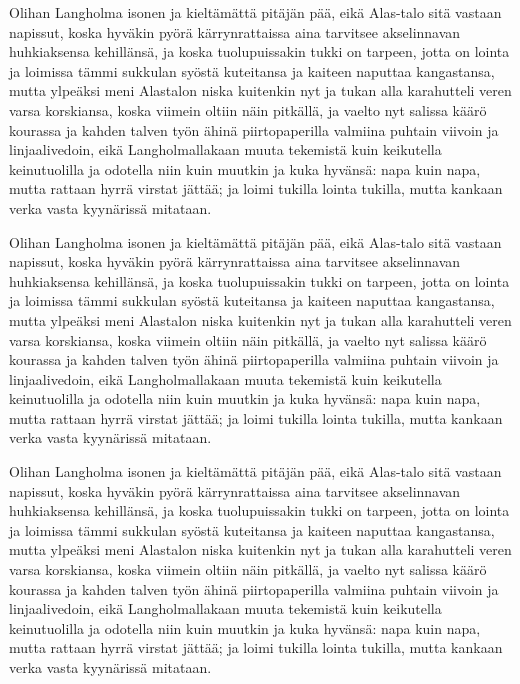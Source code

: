 \documentclass[twoside,a4paper]{article}
\begin{document}
Olihan Langholma isonen ja kielt\"{a}m\"{a}tt\"{a} pit\"{a}j\"{a}n p\"{a}\"{a}, eik\"{a} Alas-talo sit\"{a}
vastaan napissut, koska hyv\"{a}kin py\"{o}r\"{a} k\"{a}rrynrattaissa aina tarvitsee
akselinnavan huhkiaksensa kehill\"{a}ns\"{a}, ja koska tuolupuissakin tukki on
tarpeen, jotta on lointa ja loimissa t\"{a}mmi sukkulan sy\"{o}st\"{a} kuteitansa
ja kaiteen naputtaa kangastansa, mutta ylpe\"{a}ksi meni Alastalon niska
kuitenkin nyt ja tukan alla karahutteli veren varsa korskiansa, koska
viimein oltiin n\"{a}in pitk\"{a}ll\"{a}, ja vaelto nyt salissa k\"{a}\"{a}r\"{o} kourassa ja
kahden talven ty\"{o}n \"{a}hin\"{a} piirtopaperilla valmiina puhtain viivoin ja
linjaalivedoin, eik\"{a} Langholmallakaan muuta tekemist\"{a} kuin keikutella
keinutuolilla ja odotella niin kuin muutkin ja kuka hyv\"{a}ns\"{a}: napa kuin
napa, mutta rattaan hyrr\"{a} virstat j\"{a}tt\"{a}\"{a}; ja loimi tukilla lointa
tukilla, mutta kankaan verka vasta kyyn\"{a}riss\"{a} mitataan.

Olihan Langholma isonen ja kielt\"{a}m\"{a}tt\"{a} pit\"{a}j\"{a}n p\"{a}\"{a}, eik\"{a} Alas-talo sit\"{a}
vastaan napissut, koska hyv\"{a}kin py\"{o}r\"{a} k\"{a}rrynrattaissa aina tarvitsee
akselinnavan huhkiaksensa kehill\"{a}ns\"{a}, ja koska tuolupuissakin tukki on
tarpeen, jotta on lointa ja loimissa t\"{a}mmi sukkulan sy\"{o}st\"{a} kuteitansa
ja kaiteen naputtaa kangastansa, mutta ylpe\"{a}ksi meni Alastalon niska
kuitenkin nyt ja tukan alla karahutteli veren varsa korskiansa, koska
viimein oltiin n\"{a}in pitk\"{a}ll\"{a}, ja vaelto nyt salissa k\"{a}\"{a}r\"{o} kourassa ja
kahden talven ty\"{o}n \"{a}hin\"{a} piirtopaperilla valmiina puhtain viivoin ja
linjaalivedoin, eik\"{a} Langholmallakaan muuta tekemist\"{a} kuin keikutella
keinutuolilla ja odotella niin kuin muutkin ja kuka hyv\"{a}ns\"{a}: napa kuin
napa, mutta rattaan hyrr\"{a} virstat j\"{a}tt\"{a}\"{a}; ja loimi tukilla lointa
tukilla, mutta kankaan verka vasta kyyn\"{a}riss\"{a} mitataan.

Olihan Langholma isonen ja kielt\"{a}m\"{a}tt\"{a} pit\"{a}j\"{a}n p\"{a}\"{a}, eik\"{a} Alas-talo sit\"{a}
vastaan napissut, koska hyv\"{a}kin py\"{o}r\"{a} k\"{a}rrynrattaissa aina tarvitsee
akselinnavan huhkiaksensa kehill\"{a}ns\"{a}, ja koska tuolupuissakin tukki on
tarpeen, jotta on lointa ja loimissa t\"{a}mmi sukkulan sy\"{o}st\"{a} kuteitansa
ja kaiteen naputtaa kangastansa, mutta ylpe\"{a}ksi meni Alastalon niska
kuitenkin nyt ja tukan alla karahutteli veren varsa korskiansa, koska
viimein oltiin n\"{a}in pitk\"{a}ll\"{a}, ja vaelto nyt salissa k\"{a}\"{a}r\"{o} kourassa ja
kahden talven ty\"{o}n \"{a}hin\"{a} piirtopaperilla valmiina puhtain viivoin ja
linjaalivedoin, eik\"{a} Langholmallakaan muuta tekemist\"{a} kuin keikutella
keinutuolilla ja odotella niin kuin muutkin ja kuka hyv\"{a}ns\"{a}: napa kuin
napa, mutta rattaan hyrr\"{a} virstat j\"{a}tt\"{a}\"{a}; ja loimi tukilla lointa
tukilla, mutta kankaan verka vasta kyyn\"{a}riss\"{a} mitataan.
\end{document}
